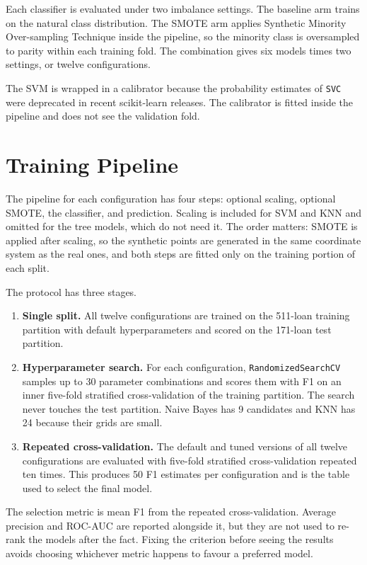 Each classifier is evaluated under two imbalance settings. The baseline arm trains on the natural class distribution. The SMOTE arm applies Synthetic Minority Over-sampling Technique inside the pipeline, so the minority class is oversampled to parity within each training fold. The combination gives six models times two settings, or twelve configurations.

The SVM is wrapped in a calibrator because the probability estimates of \texttt{SVC} were deprecated in recent scikit-learn releases. The calibrator is fitted inside the pipeline and does not see the validation fold.

\section{Training Pipeline}
\label{sec:training-pipeline}

The pipeline for each configuration has four steps: optional scaling, optional SMOTE, the classifier, and prediction. Scaling is included for SVM and KNN and omitted for the tree models, which do not need it. The order matters: SMOTE is applied after scaling, so the synthetic points are generated in the same coordinate system as the real ones, and both steps are fitted only on the training portion of each split.

The protocol has three stages.

\begin{enumerate}
    \item \textbf{Single split.} All twelve configurations are trained on the 511-loan training partition with default hyperparameters and scored on the 171-loan test partition.
    \item \textbf{Hyperparameter search.} For each configuration, \texttt{RandomizedSearchCV} samples up to 30 parameter combinations and scores them with F1 on an inner five-fold stratified cross-validation of the training partition. The search never touches the test partition. Naive Bayes has 9 candidates and KNN has 24 because their grids are small.
    \item \textbf{Repeated cross-validation.} The default and tuned versions of all twelve configurations are evaluated with five-fold stratified cross-validation repeated ten times. This produces 50 F1 estimates per configuration and is the table used to select the final model.
\end{enumerate}

The selection metric is mean F1 from the repeated cross-validation. Average precision and ROC-AUC are reported alongside it, but they are not used to re-rank the models after the fact. Fixing the criterion before seeing the results avoids choosing whichever metric happens to favour a preferred model.

